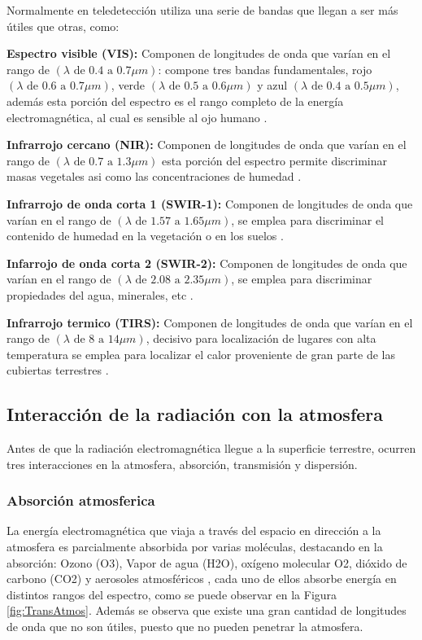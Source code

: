 	Normalmente en teledetección utiliza una serie de bandas que llegan a ser más útiles que otras, como:
	
	
	\textbf{Espectro visible (VIS): } Componen de longitudes de onda que varían en el rango de \( (\lambda \text{ de } 0.4 \text{ a } 0.7 \mu m) \): compone tres bandas fundamentales, rojo \( (\lambda \text{ de } 0.6 \text{ a } 0.7 \mu m) \), verde \( (\lambda \text{ de } 0.5 \text{ a } 0.6 \mu m) \) y azul \( (\lambda \text{ de } 0.4 \text{ a } 0.5 \mu m) \), además esta porción del espectro es el rango completo de la energía electromagnética, al cual es sensible al ojo humano \parencite{halliday2015physics}.
	
	\textbf{Infrarrojo cercano (NIR): } Componen de longitudes de onda que varían en el rango de \( (\lambda \text{ de } 0.7 \text{ a } 1.3 \mu m) \) esta porción del espectro permite discriminar masas vegetales asi como las concentraciones de humedad \parencite{halliday2015physics}.
	
	\textbf{Infrarrojo de onda corta 1 (SWIR-1): } Componen de longitudes de onda que varían en el rango de \( (\lambda \text{ de } 1.57 \text{ a } 1.65 \mu m) \), se emplea para discriminar el contenido de humedad en la vegetación o en los suelos \parencite{halliday2015physics}. 
	
	\textbf{Infarrojo de onda corta 2 (SWIR-2): } Componen de longitudes de onda que varían en el rango de \( (\lambda \text{ de } 2.08 \text{ a } 2.35 \mu m) \), se emplea para discriminar propiedades del agua, minerales, etc \parencite{halliday2015physics}.
	
	\textbf{Infrarrojo termico (TIRS): } Componen de longitudes de onda que varían en el rango de \( (\lambda \text{ de } 8 \text{ a } 14 \mu m) \), decisivo para localización de lugares con alta temperatura se emplea para localizar el calor proveniente de gran parte de las cubiertas terrestres \parencite{halliday2015physics}.
	
	\subsection{Interacción de la radiación con la atmosfera}
	Antes de que la radiación electromagnética llegue a la superficie terrestre, ocurren tres interacciones en la atmosfera, absorción, transmisión y dispersión.
	\subsubsection{Absorción atmosferica}
	La energía electromagnética que viaja a través del espacio en dirección a la atmosfera es parcialmente absorbida por varias moléculas, destacando en la absorción: Ozono (O3), Vapor de agua (H2O), oxígeno molecular O2, dióxido de carbono (CO2) y aerosoles atmosféricos \parencite{geotig}, cada uno de ellos absorbe energía en distintos rangos del espectro, como se puede observar en la Figura \ref{fig:TransAtmos}. Además se observa que existe una gran cantidad de longitudes de onda que no son útiles, puesto que no pueden penetrar la atmosfera. 
	
